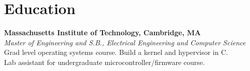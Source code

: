 \section{Education}

\textbf{Massachusetts Institute of Technology, Cambridge, MA}\\
\textit{Master of Engineering and S.B., Electrical Engineering and Computer Science}\\
Grad level operating systems course. Build a kernel and hypervisor in C.\\
Lab assistant for undergraduate microcontroller/firmware course.


